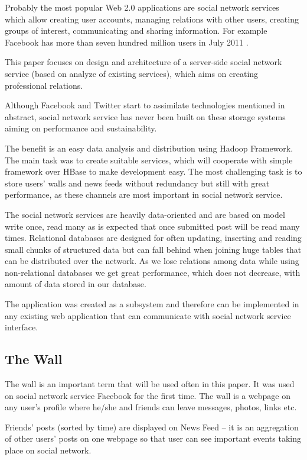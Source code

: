 \documentclass{llncs}
\begin{document}
Probably the most popular Web 2.0 applications are social network services
which allow creating user accounts, managing relations with other users,
creating groups of interest, communicating and sharing information. For
example Facebook has more than seven hundred million users in July 2011
\cite{fb}.

This paper focuses on design and architecture of a server-side social network
service (based on analyze of existing services), which aims on creating
professional relations.

Although Facebook and Twitter start to assimilate technologies mentioned in
abstract, social network service has never been built on these storage systems
aiming on performance and sustainability.

The benefit is an easy data analysis and distribution using Hadoop Framework.
The main task was to create suitable services, which will cooperate with
simple framework over HBase to make development easy. The most challenging
task is to store users' walls and news feeds without redundancy but still with
great performance, as these channels are most important in social network
service.

The social network services are heavily data-oriented and are based on model
write once, read many as is expected that once submitted post will be read
many times. Relational databases are designed for often updating, inserting
and reading small chunks of structured data but can fall behind when joining
huge tables that can be distributed over the network. As we lose relations
among data while using non-relational databases we get great performance,
which does not decrease, with amount of data stored in our database.

The application was created as a subsystem and therefore can be implemented in
any existing web application that can communicate with social network service
interface.

\subsection{The Wall}
The wall is an important term that will be used often in this paper. It was
used on social network service Facebook for the first time. The wall is a
webpage on any user's profile where he/she and friends can leave messages,
photos, links etc.

Friends' posts (sorted by time) are displayed on News Feed – it is an
aggregation of other users' posts on one webpage so that user can see
important events taking place on social network.
\end{document}
